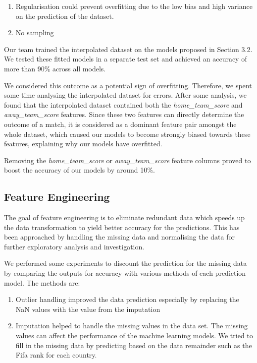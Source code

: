 \documentclass[8pt]{article}
\begin{document}
\begin{enumerate}
    \item Regularisation could prevent overfitting due to the low bias and high variance on the prediction of the dataset.
    \item No sampling
\end{enumerate}

Our team trained the interpolated dataset on the models proposed in Section 3.2. We tested these fitted models in a separate test set and achieved an accuracy of more than 90\% across all models.

We considered this outcome as a potential sign of overfitting. Therefore, we spent some time analysing the interpolated dataset for errors. After some analysis, we found that the interpolated dataset contained both the \textit{home\_team\_score} and \textit{away\_team\_score} features. Since these two features can directly determine the outcome of a match, it is considered as a dominant feature pair amongst the whole dataset, which caused our models to become strongly biased towards these features, explaining why our models have overfitted.

Removing the \textit{home\_team\_score} or \textit{away\_team\_score} feature columns proved to boost the accuracy of our models by around 10\%.


\subsection{Feature Engineering}
The goal of feature engineering is to eliminate redundant data which speeds up the data transformation to yield better accuracy for the predictions. This has been approached by handling the missing data and normalising the data for further exploratory analysis and investigation.

We performed some experiments to discount the prediction for the missing data by comparing the outputs for accuracy with various methods of each prediction model. The methods are:
\begin{enumerate}
    \item Outlier handling improved the data prediction especially by replacing the NaN values with the value from the imputation 
    \item Imputation helped to handle the missing values in the data set. The missing values can affect the performance of the machine learning models. We tried to fill in the missing data by predicting based on the data remainder such as the Fifa rank for each country.
\end{enumerate}
\end{document}
